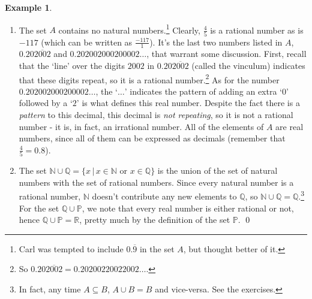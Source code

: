 \documentclass[11pt]{article}
\theoremstyle{definition}  %
\newtheorem{ex}{\bf Example}
\begin{document}
\begin{ex}
\begin{enumerate}
\item   The set $A$ contains no natural numbers.\footnote{Carl was tempted to include $0.\overline{9}$ in the set $A$, but thought better of it.  }  Clearly, $\frac{4}{5}$ is a rational number as is $-117$ (which can be written as $\frac{-117}{1}$). It's the last two numbers listed in $A$, $0.20\overline{2002}$ and $0.202002000200002 \ldots$, that warrant some discussion.  First, recall that the `line' over the digits $2002$ in $0.20\overline{2002}$ (called the vinculum) indicates that these digits repeat, so it is a rational number.\footnote{So $0.20\overline{2002} = 0.20200220022002 \ldots$.}  As for the number $0.202002000200002 \ldots$, the `$\ldots$' indicates the pattern of adding an extra `$0$' followed by a `$2$' is what defines this real number.  Despite the fact there is a \textit{pattern} to this decimal, this decimal is \textit{not repeating}, so it is not a rational number - it is, in fact, an irrational number.  All of the elements of $A$ are real numbers, since all of them can be expressed as decimals (remember that $\frac{4}{5} = 0.8$).



\item  The set $\mathbb{N} \cup \mathbb{Q} = \{ x \, | \, \text{$x \in \mathbb{N}$ or $x \in \mathbb{Q}$} \}$ is the union of the set of natural numbers with the set of rational numbers.  Since every natural number is a rational number, $\mathbb{N}$ doesn't contribute any new elements to $\mathbb{Q}$, so $\mathbb{N} \cup \mathbb{Q} = \mathbb{Q}$.\footnote{In fact, any time $A \subseteq B$, $A \cup B = B$ and vice-versa.  See the exercises.}  For the  set $\mathbb{Q} \cup \mathbb P$, we note that every real number is either rational or not, hence $\mathbb{Q} \cup \mathbb P = \mathbb{R}$, pretty much by the definition of the set $\mathbb P$.  \qed


\end{enumerate}


\end{ex}
\end{document}
